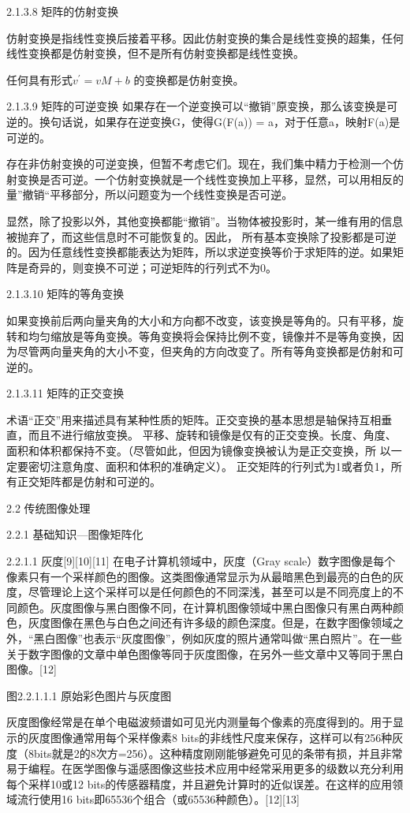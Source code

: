 2.1.3.8 矩阵的仿射变换

仿射变换是指线性变换后接着平移。因此仿射变换的集合是线性变换的超集，任何线性变换都是仿射变换，但不是所有仿射变换都是线性变换。

任何具有形式$ v^\prime  = vM + b$ 的变换都是仿射变换。

2.1.3.9 矩阵的可逆变换
如果存在一个逆变换可以“撤销”原变换，那么该变换是可逆的。换句话说，如果存在逆变换G，使得G(F(a)) = a，对于任意a，映射F(a)是可逆的。

存在非仿射变换的可逆变换，但暂不考虑它们。现在，我们集中精力于检测一个仿射变换是否可逆。一个仿射变换就是一个线性变换加上平移，显然，可以用相反的量”撤销“平移部分，所以问题变为一个线性变换是否可逆。

显然，除了投影以外，其他变换都能“撤销”。当物体被投影时，某一维有用的信息被抛弃了，而这些信息时不可能恢复的。因此，
所有基本变换除了投影都是可逆的。因为任意线性变换都能表达为矩阵，所以求逆变换等价于求矩阵的逆。如果矩阵是奇异的，则变换不可逆；可逆矩阵的行列式不为0。

2.1.3.10 矩阵的等角变换

如果变换前后两向量夹角的大小和方向都不改变，该变换是等角的。只有平移，旋转和均匀缩放是等角变换。等角变换将会保持比例不变，镜像并不是等角变换，因为尽管两向量夹角的大小不变，但夹角的方向改变了。所有等角变换都是仿射和可逆的。

2.1.3.11 矩阵的正交变换

术语“正交”用来描述具有某种性质的矩阵。正交变换的基本思想是轴保持互相垂直，而且不进行缩放变换。
平移、旋转和镜像是仅有的正交变换。长度、角度、面积和体积都保持不变。（尽管如此，但因为镜像变换被认为是正交变换，所
以一定要密切注意角度、面积和体积的准确定义）。
正交矩阵的行列式为1或者负1，所有正交矩阵都是仿射和可逆的。

2.2 传统图像处理

2.2.1 基础知识---图像矩阵化

2.2.1.1 灰度[9][10][11]
	在电子计算机领域中，灰度（Gray scale）数字图像是每个像素只有一个采样颜色的图像。这类图像通常显示为从最暗黑色到最亮的白色的灰度，尽管理论上这个采样可以是任何颜色的不同深浅，甚至可以是不同亮度上的不同颜色。灰度图像与黑白图像不同，在计算机图像领域中黑白图像只有黑白两种颜色，灰度图像在黑色与白色之间还有许多级的颜色深度。但是，在数字图像领域之外，“黑白图像”也表示“灰度图像”，例如灰度的照片通常叫做“黑白照片”。在一些关于数字图像的文章中单色图像等同于灰度图像，在另外一些文章中又等同于黑白图像。[12]

图2.2.1.1.1 原始彩色图片与灰度图

灰度图像经常是在单个电磁波频谱如可见光内测量每个像素的亮度得到的。用于显示的灰度图像通常用每个采样像素8 bits的非线性尺度来保存，这样可以有256种灰度（8bits就是2的8次方=256）。这种精度刚刚能够避免可见的条带有损，并且非常易于编程。在医学图像与遥感图像这些技术应用中经常采用更多的级数以充分利用每个采样10或12 bits的传感器精度，并且避免计算时的近似误差。在这样的应用领域流行使用16 bits即65536个组合（或65536种颜色）。[12][13]

